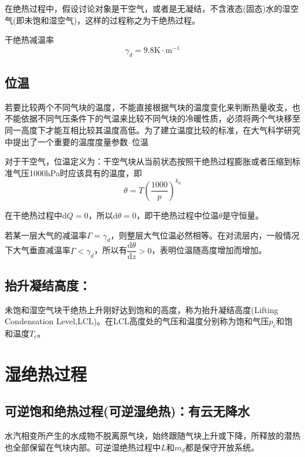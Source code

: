 \documentclass[UTF8,a4paper,11pt,oneside]{ctexbook}
\begin{document}
在绝热过程中，假设讨论对象是干空气，或者是无凝结，不含液态(固态)水的湿空气(即未饱和湿空气)，这样的过程称之为干绝热过程。

干绝热减温率
\begin{equation}
\gamma_d=9.8\mathrm{K\cdot{}m^{-1}}
\end{equation}

\subsection{位温}

若要比较两个不同气块的温度，不能直接根据气块的温度变化来判断热量收支，也不能依据不同气压条件下的气温来比较不同气块的冷暖性质，必须将两个气块移至同一高度下才能互相比较其温度高低。为了建立温度比较的标准，在大气科学研究中提出了一个重要的温度度量参数--位温

对于干空气，位温定义为：干空气块从当前状态按照干绝热过程膨胀或者压缩到标准气压1000hPa时应该具有的温度，即
\begin{equation}
\theta=T\left(\dfrac{1000}{p}\right)^{k_d}
\end{equation}

在干绝热过程中\(\mathrm{d}Q=0\)，所以\(\mathrm{d}\theta=0\)，即干绝热过程中位温\(\theta\)是守恒量。

若某一层大气的减温率\(\Gamma=\gamma_d\)，则整层大气位温必然相等。在对流层内，一般情况下大气垂直减温率\(\Gamma<\gamma_d\)，所以有\(\dfrac{\mathrm{d}\theta}{\mathrm{d}z}>0\)，表明位温随高度增加而增加。

\subsection{抬升凝结高度：}
未饱和湿空气块干绝热上升刚好达到饱和的高度，称为抬升凝结高度(Lifting Condensation Level,LCL)。在LCL高度处的气压和温度分别称为饱和气压\(p_c\)和饱和温度\(T_c\)。

\section{湿绝热过程}

\subsection{可逆饱和绝热过程(可逆湿绝热)：有云无降水}

水汽相变所产生的水成物不脱离原气块，始终跟随气块上升或下降，所释放的潜热也全部保留在气块内部。可逆湿绝热过程中\(L\)和\(m_d\)都是保守开放系统。
\end{document}
